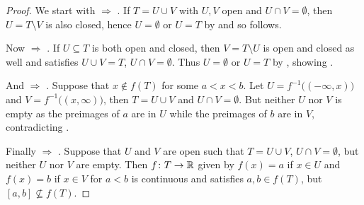 \documentclass[a4paper,parskip=half,numbers=enddot, DIV=12]{scrreprt}
\begin{document}
	\begin{proof}
		We start with  $\Rightarrow$ . If $T=U\cup V$ with $U,V$ open and $U\cap V=\emptyset$, then $U=T\setminus V$ is also closed, hence $U=\emptyset$ or $U=T$ by  and so  follows.
		
		Now  $\Rightarrow$ . If $U\subseteq T$ is both open and closed, then $V=T\setminus U$ is open and closed as well and satisfies $U\cup V=T$, $U\cap V=\emptyset$. Thus $U=\emptyset$ or $U=T$ by , showing .
		
		And  $\Rightarrow$ . Suppose that $x\notin f(T)$ for some $a<x<b$. Let $U=f^{-1}\big((-\infty,x)\big)$ and $V=f^{-1}\big((x,\infty)\big)$, then $T=U\cup V$ and $U\cap V=\emptyset$. But neither $U$ nor $V$ is empty as the preimages of $a$ are in $U$ while the preimages of $b$ are in $V$, contradicting .
		
		Finally  $\Rightarrow$ . Suppose that $U$ and $V$ are open such that $T=U\cup V$, $U\cap V=\emptyset$, but neither $U$ nor $V$ are empty. Then $f\colon T\morphism\IR$ given by $f(x)=a$ if $x\in U$ and $f(x)=b$ if $x\in V$ for $a<b$ is continuous and satisfies $a,b\in f(T)$, but $[a,b]\not\subseteq f(T)$.
	\end{proof}
\end{document}
